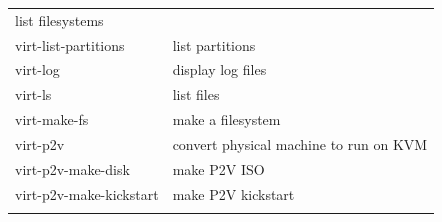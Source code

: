 \documentclass[
  14pt,
  english,
  a4paper,
]{scrreprt}
\begin{document}
\begin{longtable}[]{@{}ll@{}}
\begin{minipage}[t]{0.61\columnwidth}
list filesystems\strut
\end{minipage}\tabularnewline
\begin{minipage}[t]{0.33\columnwidth}\raggedright
virt-list-partitions\strut
\end{minipage} & \begin{minipage}[t]{0.61\columnwidth}\raggedright
list partitions\strut
\end{minipage}\tabularnewline
\begin{minipage}[t]{0.33\columnwidth}\raggedright
virt-log\strut
\end{minipage} & \begin{minipage}[t]{0.61\columnwidth}\raggedright
display log files\strut
\end{minipage}\tabularnewline
\begin{minipage}[t]{0.33\columnwidth}\raggedright
virt-ls\strut
\end{minipage} & \begin{minipage}[t]{0.61\columnwidth}\raggedright
list files\strut
\end{minipage}\tabularnewline
\begin{minipage}[t]{0.33\columnwidth}\raggedright
virt-make-fs\strut
\end{minipage} & \begin{minipage}[t]{0.61\columnwidth}\raggedright
make a filesystem\strut
\end{minipage}\tabularnewline
\begin{minipage}[t]{0.33\columnwidth}\raggedright
virt-p2v\strut
\end{minipage} & \begin{minipage}[t]{0.61\columnwidth}\raggedright
convert physical machine to run on KVM\strut
\end{minipage}\tabularnewline
\begin{minipage}[t]{0.33\columnwidth}\raggedright
virt-p2v-make-disk\strut
\end{minipage} & \begin{minipage}[t]{0.61\columnwidth}\raggedright
make P2V ISO\strut
\end{minipage}\tabularnewline
\begin{minipage}[t]{0.33\columnwidth}\raggedright
virt-p2v-make-kickstart\strut
\end{minipage} & \begin{minipage}[t]{0.61\columnwidth}\raggedright
make P2V kickstart\strut
\end{minipage}\tabularnewline
\begin{minipage}[t]{0.33\columnwidth}\raggedright

\end{minipage}
\end{longtable}
\end{document}
